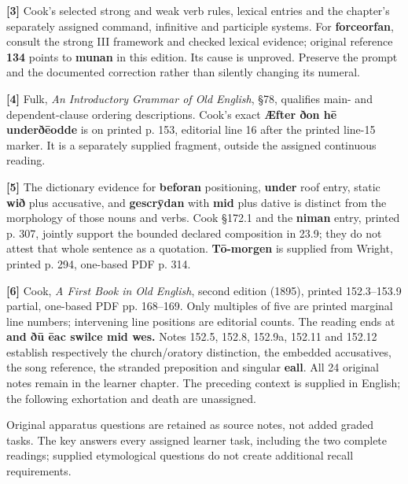 \textbf{[3]} Cook’s selected strong and weak verb rules, lexical entries and the chapter’s separately assigned command, infinitive and participle systems. For \textbf{forceorfan}, consult the strong III framework and checked lexical evidence; original reference \textbf{134} points to \textbf{munan} in this edition. Its cause is unproved. Preserve the prompt and the documented correction rather than silently changing its numeral.

\textbf{[4]} Fulk, \emph{An Introductory Grammar of Old English}, §78, qualifies main- and dependent-clause ordering descriptions. Cook’s exact \textbf{Æfter ðon hē underðēodde} is on printed p. 153, editorial line 16 after the printed line-15 marker. It is a separately supplied fragment, outside the assigned continuous reading.

\textbf{[5]} The dictionary evidence for \textbf{beforan} positioning, \textbf{under} roof entry, static \textbf{wið} plus accusative, and \textbf{gescrȳdan} with \textbf{mid} plus dative is distinct from the morphology of those nouns and verbs. Cook §172.1 and the \textbf{niman} entry, printed p. 307, jointly support the bounded declared composition in 23.9; they do not attest that whole sentence as a quotation. \textbf{Tō-morgen} is supplied from Wright, printed p. 294, one-based PDF p. 314.

\textbf{[6]} Cook, \emph{A First Book in Old English}, second edition (1895), printed 152.3–153.9 partial, one-based PDF pp. 168–169. Only multiples of five are printed marginal line numbers; intervening line positions are editorial counts. The reading ends at \textbf{and ðū ēac swilce mid wes.} Notes 152.5, 152.8, 152.9a, 152.11 and 152.12 establish respectively the church/\allowbreak{}oratory distinction, the embedded accusatives, the song reference, the stranded preposition and singular \textbf{eall}. All 24 original notes remain in the learner chapter. The preceding context is supplied in English; the following exhortation and death are unassigned.

Original apparatus questions are retained as source notes, not added graded tasks. The key answers every assigned learner task, including the two complete readings; supplied etymological questions do not create additional recall requirements.

\endgroup

\par\label{end-ch13-key}
\clearpage\endgroup
